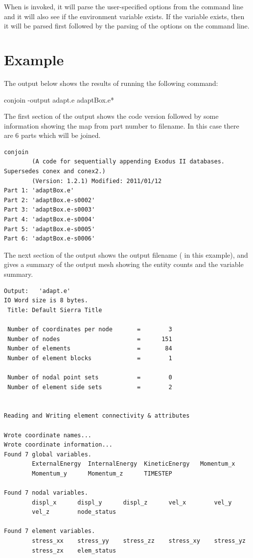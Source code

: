 When \conjoin{} is invoked, it will parse the user-specified options from
the command line and it will also see if the environment variable
 exists.  If the variable exists, then it will be
parsed first followed by the parsing of the options on the command line.

\section{Example}
The output below shows the results of running the following command:
\begin{syntax}
	conjoin -output adapt.e adaptBox.e*
\end{syntax}

The first section of the output shows the code version followed by some
information showing the map from part number to filename. In this case
there are 6 parts which will be joined.

\begin{verbatim}
conjoin
        (A code for sequentially appending Exodus II databases. Supersedes conex and conex2.)
        (Version: 1.2.1) Modified: 2011/01/12
Part 1: 'adaptBox.e'
Part 2: 'adaptBox.e-s0002'
Part 3: 'adaptBox.e-s0003'
Part 4: 'adaptBox.e-s0004'
Part 5: 'adaptBox.e-s0005'
Part 6: 'adaptBox.e-s0006'
\end{verbatim}
\sectionline
The next section of the output shows the output filename
( in this example), and gives a summary of the output
mesh showing the entity counts and the variable summary.
\begin{verbatim}
Output:   'adapt.e'
IO Word size is 8 bytes.
 Title: Default Sierra Title

 Number of coordinates per node       =        3
 Number of nodes                      =      151
 Number of elements                   =       84
 Number of element blocks             =        1

 Number of nodal point sets           =        0
 Number of element side sets          =        2


Reading and Writing element connectivity & attributes

Wrote coordinate names...
Wrote coordinate information...
Found 7 global variables.
        ExternalEnergy  InternalEnergy  KineticEnergy   Momentum_x      
        Momentum_y      Momentum_z      TIMESTEP        

Found 7 nodal variables.
        displ_x      displ_y      displ_z      vel_x        vel_y        
        vel_z        node_status  

Found 7 element variables.
        stress_xx    stress_yy    stress_zz    stress_xy    stress_yz    
        stress_zx    elem_status  
\end{verbatim}
\sectionline

